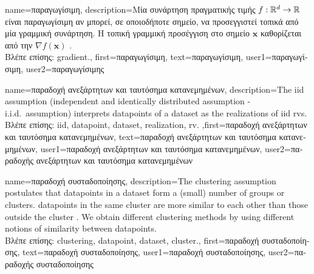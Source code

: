 {name={\foreignlanguage{greek}{παραγωγίσιμη}},
	description={\foreignlanguage{greek}{Μία συνάρτηση πραγματικής τιμής} 
		$f: \mathbb{R}^{d} \rightarrow \mathbb{R}$ 
		\foreignlanguage{greek}{είναι παραγωγίσιμη αν μπορεί, σε οποιοδήποτε σημείο, να προσεγγιστεί τοπικά από μία  
		γραμμική συνάρτηση. Η τοπική γραμμική προσέγγιση στο σημείο $\mathbf{x}$ καθορίζεται
		από την}  $\nabla f ( \mathbf{x})$ \cite{RudinBookPrinciplesMatheAnalysis}.\\
		\foreignlanguage{greek}{Βλέπε επίσης:} \gls{gradient}.},
	first={\foreignlanguage{greek}{παραγωγίσιμη}},
	text={\foreignlanguage{greek}{παραγωγίσιμη}},
	user1={\foreignlanguage{greek}{παραγωγίσιμη}}, %
  	user2={\foreignlanguage{greek}{παραγωγίσιμης}} %
}

{name={\foreignlanguage{greek}{παραδοχή ανεξάρτητων και ταυτόσημα κατανεμημένων}}, 
	description={The \gls{iid} assumption 
		(independent and identically distributed assumption - i.i.d.\ assumption) interprets \gls{datapoint}s of a \gls{dataset} as the 
		\gls{realization}s of \gls{iid} \gls{rv}s.\\
		\foreignlanguage{greek}{Βλέπε επίσης:} \gls{iid}, \gls{datapoint}, \gls{dataset}, \gls{realization}, \gls{rv}.
		},first={\foreignlanguage{greek}{παραδοχή ανεξάρτητων και ταυτόσημα κατανεμημένων}},
		text={\foreignlanguage{greek}{παραδοχή ανεξάρτητων και ταυτόσημα κατανεμημένων}},
		user1={\foreignlanguage{greek}{παραδοχή ανεξάρτητων και ταυτόσημα κατανεμημένων}}, %
  		user2={\foreignlanguage{greek}{παραδοχής ανεξάρτητων και ταυτόσημα κατανεμημένων}} %
}

{name={\foreignlanguage{greek}{παραδοχή συσταδοποίησης}}, 
	description={The 
		\gls{clustering} assumption postulates that \gls{datapoint}s in a \gls{dataset} form a (small) number of 
		groups or \gls{cluster}s. \Gls{datapoint}s in the same \gls{cluster} are more similar to each 
		other than those outside the \gls{cluster} \cite{SemiSupervisedBook}. We obtain different 
		\gls{clustering} methods by using different notions of similarity between \gls{datapoint}s.\\
		\foreignlanguage{greek}{Βλέπε επίσης:} \gls{clustering}, \gls{datapoint}, \gls{dataset}, \gls{cluster}.},
		first={\foreignlanguage{greek}{παραδοχή συσταδοποίησης}},
		text={\foreignlanguage{greek}{παραδοχή συσταδοποίησης}},
		user1={\foreignlanguage{greek}{παραδοχή συσταδοποίησης}}, %
		user2={\foreignlanguage{greek}{παραδοχής συσταδοποίησης}} %
}

